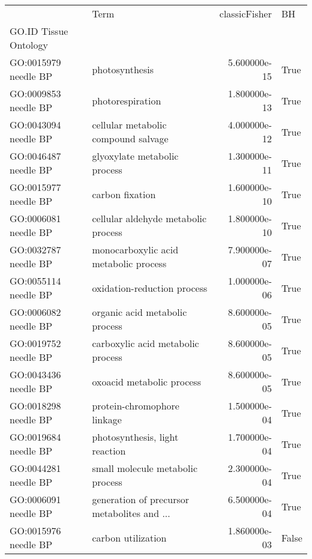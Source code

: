 \begin{tabular}{llrl}
\toprule
{} &                                         Term &  classicFisher &     BH \\
GO.ID      Tissue Ontology &                                              &                &        \\
GO:0015979 needle BP       &                               photosynthesis &   5.600000e-15 &   True \\
\midrule
GO:0009853 needle BP       &                             photorespiration &   1.800000e-13 &   True \\
GO:0043094 needle BP       &          cellular metabolic compound salvage &   4.000000e-12 &   True \\
GO:0046487 needle BP       &                 glyoxylate metabolic process &   1.300000e-11 &   True \\
GO:0015977 needle BP       &                              carbon fixation &   1.600000e-10 &   True \\
GO:0006081 needle BP       &          cellular aldehyde metabolic process &   1.800000e-10 &   True \\
GO:0032787 needle BP       &        monocarboxylic acid metabolic process &   7.900000e-07 &   True \\
GO:0055114 needle BP       &                  oxidation-reduction process &   1.000000e-06 &   True \\
GO:0006082 needle BP       &               organic acid metabolic process &   8.600000e-05 &   True \\
GO:0019752 needle BP       &            carboxylic acid metabolic process &   8.600000e-05 &   True \\
GO:0043436 needle BP       &                    oxoacid metabolic process &   8.600000e-05 &   True \\
GO:0018298 needle BP       &                  protein-chromophore linkage &   1.500000e-04 &   True \\
GO:0019684 needle BP       &               photosynthesis, light reaction &   1.700000e-04 &   True \\
GO:0044281 needle BP       &             small molecule metabolic process &   2.300000e-04 &   True \\
GO:0006091 needle BP       &  generation of precursor metabolites and ... &   6.500000e-04 &   True \\
GO:0015976 needle BP       &                           carbon utilization &   1.860000e-03 &  False \\

\end{tabular}
